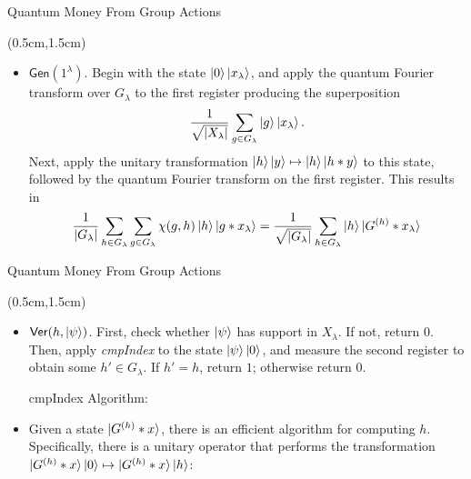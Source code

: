 \documentclass{beamer}
\theoremstyle{definition}
\newcommand{\gen}{\mathsf{Gen}}
\newcommand{\ver}{\mathsf{Ver}}
\begin{document}
\begin{frame}{Quantum Money From Group Actions}
    
    \begin{textblock*}{12cm}(0.5cm,1.5cm)
            
        
        \begin{itemize}
        \item $\gen(1^\lambda)$. Begin with the state $\ket{0}\ket{x_\lambda}$, and apply the quantum Fourier transform over $G_\lambda$ to the first register producing the superposition
        \[ \frac{1}{\sqrt{{|X_\lambda|}}} \sum_{g \in G_\lambda} \ket{g}\ket{x_\lambda}. \]
        Next, apply the unitary transformation $\ket{h}\ket{y} \mapsto \ket{h}\ket{h * y}$ to this state, followed by the quantum Fourier transform on the first register. This results in
        \[ \frac{1}{{|G_\lambda|}} \sum_{h \in G_\lambda} \sum_{g \in G_\lambda} \chi(g, h) \ket{h}\ket{g * x_\lambda} = \frac{1}{\sqrt{{|G_\lambda|}}} \sum_{h \in G_\lambda} \ket{h} \ket{G^{(h)} * x_\lambda} \]

        \end{itemize}

        
    \end{textblock*}


\end{frame}




\begin{frame}{Quantum Money From Group Actions}
    
    \begin{textblock*}{12cm}(0.5cm,1.5cm)
            
        
        \begin{itemize}
        \item $\ver(h, \ket{\psi})$. First, check whether $\ket{\psi}$ has support in $X_\lambda$. If not, return $0$. Then, apply \textit{cmpIndex} to the state $\ket{\psi}\ket{0}$, and measure the second register to obtain some $h' \in G_\lambda$. If $h' = h$, return $1$; otherwise return $0$.
        
        \vspace{1.5cm}
        cmpIndex Algorithm:
        \vspace{0.3cm}
        \item  Given a state $\ket{G^{(h)} * x}$, there is an efficient algorithm for computing $h$.
        Specifically, there is a unitary operator that performs the transformation $\ket{G^{(h)} * x} \ket{0} \mapsto \ket{G^{(h)} * x} \ket{h}$:
        \end{itemize}

        
    \end{textblock*}


\end{frame}
\end{document}
